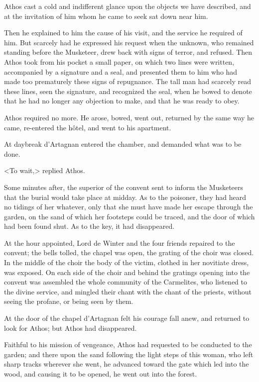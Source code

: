 Athos cast a cold and indifferent glance upon the objects we have described, and at the invitation of him whom he came to seek sat down near him. 

Then he explained to him the cause of his visit, and the service he required of him. But scarcely had he expressed his request when the unknown, who remained standing before the Musketeer, drew back with signs of terror, and refused. Then Athos took from his pocket a small paper, on which two lines were written, accompanied by a signature and a seal, and presented them to him who had made too prematurely these signs of repugnance. The tall man had scarcely read these lines, seen the signature, and recognized the seal, when he bowed to denote that he had no longer any objection to make, and that he was ready to obey. 

Athos required no more. He arose, bowed, went out, returned by the same way he came, re-entered the hôtel, and went to his apartment. 

At daybreak d'Artagnan entered the chamber, and demanded what was to be done. 

<To wait,> replied Athos. 

Some minutes after, the superior of the convent sent to inform the Musketeers that the burial would take place at midday. As to the poisoner, they had heard no tidings of her whatever, only that she must have made her escape through the garden, on the sand of which her footsteps could be traced, and the door of which had been found shut. As to the key, it had disappeared. 

At the hour appointed, Lord de Winter and the four friends repaired to the convent; the bells tolled, the chapel was open, the grating of the choir was closed. In the middle of the choir the body of the victim, clothed in her novitiate dress, was exposed. On each side of the choir and behind the gratings opening into the convent was assembled the whole community of the Carmelites, who listened to the divine service, and mingled their chant with the chant of the priests, without seeing the profane, or being seen by them. 

At the door of the chapel d'Artagnan felt his courage fall anew, and returned to look for Athos; but Athos had disappeared. 

Faithful to his mission of vengeance, Athos had requested to be conducted to the garden; and there upon the sand following the light steps of this woman, who left sharp tracks wherever she went, he advanced toward the gate which led into the wood, and causing it to be opened, he went out into the forest. 

